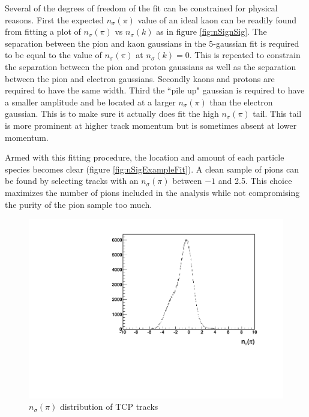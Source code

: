 \documentclass[abstract = on,listof=totoc, bibliography=totoc]{scrreprt}
\begin{document}
Several of the degrees of freedom of the fit can be constrained for physical reasons. First the expected $n_\sigma(\pi)$ value of an ideal kaon can be readily found from fitting a plot of $n_\sigma(\pi)$ vs $n_\sigma(k)$ as in figure \ref{fig:nSignSig}. The separation between the pion and kaon gaussians in the 5-gaussian fit is required to be equal to the value of $n_\sigma(\pi)$ at $n_\sigma(k) = 0$. This is repeated to constrain the separation between the pion and proton gaussians as well as the separation between the pion and electron gaussians. Secondly kaons and protons are required to have the same width. Third the ``pile up" gaussian is required to have a smaller amplitude and be located at a larger $n_\sigma(\pi)$ than the electron gaussian. This is to make sure it actually does fit the high $n_\sigma(\pi)$ tail. This tail is more prominent at higher track momentum but is sometimes absent at lower momentum.  

Armed with this fitting procedure, the location and amount of each particle species becomes clear (figure \ref{fig:nSigExampleFit}). A clean sample of pions can be found by selecting tracks with an $n_\sigma(\pi)$ between $-1$ and 2.5. This choice maximizes the number of pions included in the analysis while not compromising the purity of the pion sample too much.  


         
 \begin{figure}
\begin{center}
\includegraphics[width = .7\textwidth]{histogramExample.pdf}
\caption[$n_\sigma(\pi)$ distribution]{$n_\sigma(\pi)$ distribution of TCP tracks}
\label{fig:nSigExample}
\end{center}
\end{figure}
\end{document}
